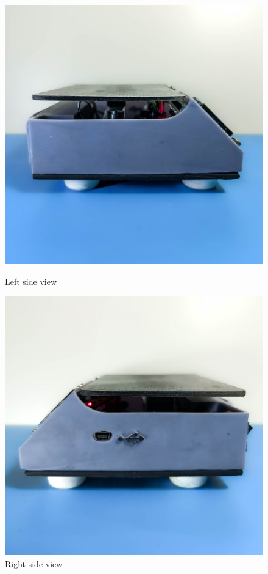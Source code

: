 \begin{figure}[ht]
\centering
\begin{minipage}{.5\textwidth} 
  \centering
  \includegraphics[width=.9\linewidth]{medias/photos/side1.jpg}
  \caption{Left side view}
  \label{fig:test1}
\end{minipage}%
\begin{minipage}{.5\textwidth} 
  \centering
  \includegraphics[width=.9\linewidth]{medias/photos/side2.jpg}
  \caption{Right side view}
  \label{fig:test2}
\end{minipage}
\end{figure}


